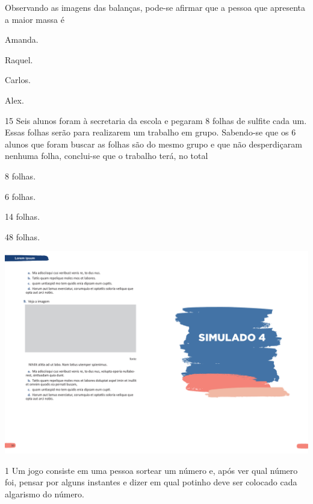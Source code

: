 Observando as imagens das balanças, pode-se afirmar que a pessoa que apresenta a maior massa é

\begin{multicols}{2}
\begin{escolha}
\item
  Amanda.
\item
  Raquel.
\item
  Carlos.
\item
  Alex.
\end{escolha}
\end{multicols}

\num{15} Seis alunos foram à secretaria da escola e pegaram 8 folhas de sulfite cada um. Essas folhas serão para realizarem um trabalho em grupo. Sabendo-se que os 6 alunos que foram buscar as folhas são do mesmo grupo
e que não desperdiçaram nenhuma folha, conclui-se que o trabalho terá, no total

\begin{multicols}{2}
\begin{escolha}
\item
  8 folhas.
\item
  6 folhas.
\item
  14 folhas.
\item
  48 folhas.
\end{escolha}
\end{multicols}

\vspace*{-3.4cm}
\hspace*{-3.7cm}\includegraphics[scale=1]{../watermarks/4simulado5ano.pdf}

\num{1} Um jogo consiste em uma pessoa sortear um número e, após ver qual número foi, pensar por alguns instantes e dizer em qual potinho deve ser colocado cada algarismo do número.



